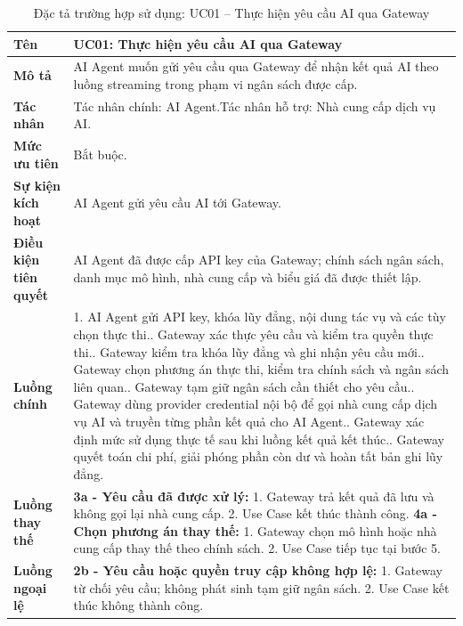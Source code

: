 \begin{longtable}{|L{4.2cm}|L{9.5cm}|}
\caption[Đặc tả UC01]{Đặc tả trường hợp sử dụng: UC01 -- Thực hiện yêu cầu AI qua Gateway} \\\hline
\textbf{Tên} & UC01: Thực hiện yêu cầu AI qua Gateway \\\hline
\textbf{Mô tả} & AI Agent muốn gửi yêu cầu qua Gateway để nhận kết quả AI theo luồng streaming trong phạm vi ngân sách được cấp.\\\hline
\textbf{Tác nhân} & Tác nhân chính: AI Agent.\newline Tác nhân hỗ trợ: Nhà cung cấp dịch vụ AI.\\\hline
\textbf{Mức ưu tiên} & Bắt buộc.\\\hline
\textbf{Sự kiện kích hoạt} & AI Agent gửi yêu cầu AI tới Gateway.\\\hline
\textbf{Điều kiện tiên quyết} & AI Agent đã được cấp API key của Gateway; chính sách ngân sách, danh mục mô hình, nhà cung cấp và biểu giá đã được thiết lập.\\\hline
\textbf{Luồng chính} &
1. AI Agent gửi API key, khóa lũy đẳng, nội dung tác vụ và các tùy chọn thực thi.. Gateway xác thực yêu cầu và kiểm tra quyền thực thi.. Gateway kiểm tra khóa lũy đẳng và ghi nhận yêu cầu mới.. Gateway chọn phương án thực thi, kiểm tra chính sách và ngân sách liên quan.. Gateway tạm giữ ngân sách cần thiết cho yêu cầu.. Gateway dùng provider credential nội bộ để gọi nhà cung cấp dịch vụ AI và truyền từng phần kết quả cho AI Agent.. Gateway xác định mức sử dụng thực tế sau khi luồng kết quả kết thúc.. Gateway quyết toán chi phí, giải phóng phần còn dư và hoàn tất bản ghi lũy đẳng.\\\hline
\textbf{Luồng thay thế} &
\textbf{3a - Yêu cầu đã được xử lý:} 1. Gateway trả kết quả đã lưu và không gọi lại nhà cung cấp. 2. Use Case kết thúc thành công.\newline
\textbf{4a - Chọn phương án thay thế:} 1. Gateway chọn mô hình hoặc nhà cung cấp thay thế theo chính sách. 2. Use Case tiếp tục tại bước 5.\\\hline
\textbf{Luồng ngoại lệ} &
\textbf{2b - Yêu cầu hoặc quyền truy cập không hợp lệ:} 1. Gateway từ chối yêu cầu; không phát sinh tạm giữ ngân sách. 2. Use Case kết thúc không thành công.\newline

\end{longtable}
